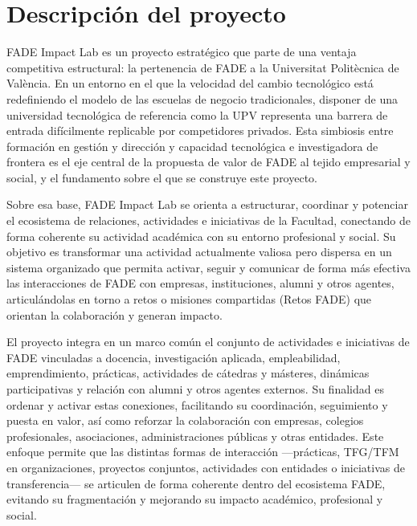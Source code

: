 \documentclass[11pt,a4paper]{scrreprt}
\begin{document}
\section{Descripción del proyecto}

\small

\small
FADE Impact Lab es un proyecto estratégico que parte de una ventaja competitiva estructural: la pertenencia de FADE a la Universitat Politècnica de València. En un entorno en el que la velocidad del cambio tecnológico está redefiniendo el modelo de las escuelas de negocio tradicionales, disponer de una universidad tecnológica de referencia como la UPV representa una barrera de entrada difícilmente replicable por competidores privados. Esta simbiosis entre formación en gestión y dirección y capacidad tecnológica e investigadora de frontera es el eje central de la propuesta de valor de FADE al tejido empresarial y social, y el fundamento sobre el que se construye este proyecto.

Sobre esa base, FADE Impact Lab se orienta a estructurar, coordinar y potenciar el ecosistema de relaciones, actividades e iniciativas de la Facultad, conectando de forma coherente su actividad académica con su entorno profesional y social. Su objetivo es transformar una actividad actualmente valiosa pero dispersa en un sistema organizado que permita activar, seguir y comunicar de forma más efectiva las interacciones de FADE con empresas, instituciones, alumni y otros agentes, articulándolas en torno a retos o misiones compartidas (Retos FADE) que orientan la colaboración y generan impacto.

El proyecto integra en un marco común el conjunto de actividades e iniciativas de FADE vinculadas a docencia, investigación aplicada, empleabilidad, emprendimiento, prácticas, actividades de cátedras y másteres, dinámicas participativas y relación con alumni y otros agentes externos. Su finalidad es ordenar y activar estas conexiones, facilitando su coordinación, seguimiento y puesta en valor, así como reforzar la colaboración con empresas, colegios profesionales, asociaciones, administraciones públicas y otras entidades. Este enfoque permite que las distintas formas de interacción —prácticas, TFG/TFM en organizaciones, proyectos conjuntos, actividades con entidades o iniciativas de transferencia— se articulen de forma coherente dentro del ecosistema FADE, evitando su fragmentación y mejorando su impacto académico, profesional y social.
\end{document}
